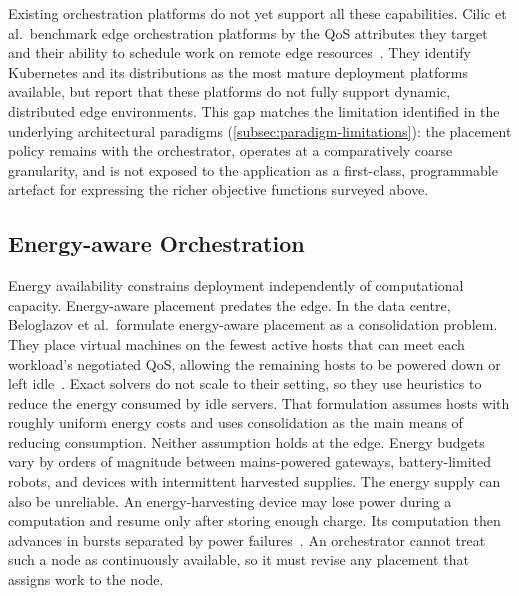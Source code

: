 Existing orchestration platforms do not yet support all these capabilities.
%
Cilic et al.\ benchmark edge orchestration platforms by the \ac{QoS} attributes they target and their ability to schedule work on remote edge resources~\cite{DBLP:journals/sensors/CilicKZK23}.
%
They identify Kubernetes and its distributions as the most mature deployment platforms available,
but report that these platforms do not fully support dynamic, distributed edge environments.
%
This gap matches the limitation identified in the underlying architectural paradigms (\cref{subsec:paradigm-limitations}):
the placement policy remains with the orchestrator,
operates at a comparatively coarse granularity,
and is not exposed to the application as a first-class, programmable artefact for expressing the richer objective functions surveyed above.

\subsection{Energy-aware Orchestration}
\label{subsec:energy-aware-orchestration}

Energy availability constrains deployment independently of computational capacity.
%
Energy-aware placement predates the edge.
%
In the data centre, Beloglazov et al.\ formulate energy-aware placement as a consolidation problem.
They place virtual machines on the fewest active hosts that can meet each workload's negotiated \ac{QoS}, allowing the remaining hosts to be powered down or left idle~\cite{DBLP:journals/fgcs/BeloglazovAB12}.
%
Exact solvers do not scale to their setting,
so they use heuristics to reduce the energy consumed by idle servers.
%
That formulation assumes hosts with roughly uniform energy costs and uses consolidation as the main means of reducing consumption.
%
Neither assumption holds at the edge.
Energy budgets vary by orders of magnitude between mains-powered gateways, battery-limited robots, and devices with intermittent harvested supplies.
%
The energy supply can also be unreliable.
An energy-harvesting device may lose power during a computation and resume only after storing enough charge.
Its computation then advances in bursts separated by power failures~\cite{DBLP:conf/snapl/LuciaBCMR17}.
%
An orchestrator cannot treat such a node as continuously available,
so it must revise any placement that assigns work to the node.

